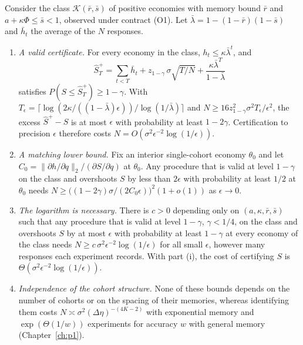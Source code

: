 \begin{theorem}\label{p2:thm:certcost}
Consider the class $\mathcal K(\bar r,\bar s)$ of positive economies with memory bound $\bar r$ and $a+\kappa\Phi\le\bar s<1$, observed under contract (O1). Let $\bar\lambda=1-(1-\bar r)(1-\bar s)$ and $\bar h_t$ the average of the $N$ responses.
\begin{enumerate}[label=(\roman*)]
\item \emph{A valid certificate.} For every economy in the class, $h_t\le\kappa\bar\lambda^t$, and
\[
\hat S^+_T=\sum_{t<T}\bar h_t+z_{1-\gamma}\,\sigma\sqrt{T/N}+\frac{\kappa\bar\lambda^T}{1-\bar\lambda}
\]
satisfies $P(S\le\hat S^+_T)\ge1-\gamma$. With $T_\epsilon=\lceil\log(2\kappa/((1-\bar\lambda)\epsilon))/\log(1/\bar\lambda)\rceil$ and $N\ge16z_{1-\gamma}^2\sigma^2T_\epsilon/\epsilon^2$, the excess $\hat S^+-S$ is at most $\epsilon$ with probability at least $1-2\gamma$. Certification to precision $\epsilon$ therefore costs $N=O(\sigma^2\epsilon^{-2}\log(1/\epsilon))$.
\item \emph{A matching lower bound.} Fix an interior single-cohort economy $\theta_0$ and let $C_0=\|\partial h/\partial q\|_2/(\partial S/\partial q)$ at $\theta_0$. Any procedure that is valid at level $1-\gamma$ on the class and overshoots $S$ by less than $2\epsilon$ with probability at least $1/2$ at $\theta_0$ needs $N\ge\bigl((1-2\gamma)\sigma/(2C_0\epsilon)\bigr)^2(1+o(1))$ as $\epsilon\to0$.
\item \emph{The logarithm is necessary.} There is $c>0$ depending only on $(a,\kappa,\bar r,\bar s)$ such that any procedure that is valid at level $1-\gamma$, $\gamma<1/4$, on the class and overshoots $S$ by at most $\epsilon$ with probability at least $1-\gamma$ at every economy of the class needs $N\ge c\,\sigma^2\epsilon^{-2}\log(1/\epsilon)$ for all small $\epsilon$, however many responses each experiment records. With part (i), the cost of certifying $S$ is $\Theta(\sigma^2\epsilon^{-2}\log(1/\epsilon))$.
\item \emph{Independence of the cohort structure.} None of these bounds depends on the number of cohorts or on the spacing of their memories, whereas identifying them costs $N\asymp\sigma^2(\Delta\eta)^{-(4K-2)}$ with exponential memory and $\exp(\Theta(1/w))$ experiments for accuracy $w$ with general memory (Chapter~\ref{ch:p1}).
\end{enumerate}
\end{theorem}

